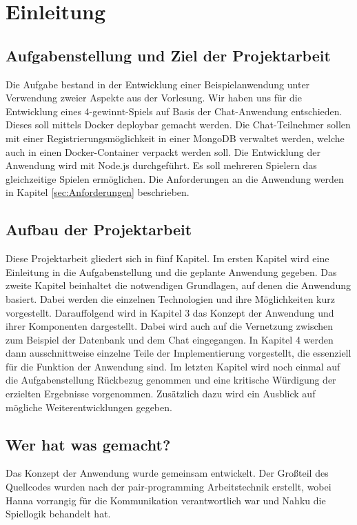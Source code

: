 
\chapter{Einleitung}\label{cha:Einleitung}

\section{Aufgabenstellung und Ziel der Projektarbeit}\label{sec:Aufgabenstellung}
Die Aufgabe bestand in der Entwicklung einer Beispielanwendung unter Verwendung zweier Aspekte aus der Vorlesung. Wir haben uns für die Entwicklung eines 4-gewinnt-Spiels auf Basis der Chat-Anwendung entschieden. Dieses soll mittels Docker deploybar gemacht werden. Die Chat-Teilnehmer sollen mit einer Registrierungsmöglichkeit in einer MongoDB verwaltet werden, welche auch in einen Docker-Container verpackt werden soll. Die Entwicklung der Anwendung wird mit Node.js durchgeführt. Es soll mehreren Spielern das gleichzeitige Spielen ermöglichen. Die Anforderungen an die Anwendung werden in Kapitel \ref{sec:Anforderungen} beschrieben.
\section{Aufbau der Projektarbeit}\label{sec:Aufbau}
Diese Projektarbeit gliedert sich in fünf Kapitel. Im ersten Kapitel wird eine Einleitung in die Aufgabenstellung und die geplante Anwendung gegeben. Das zweite Kapitel beinhaltet die notwendigen Grundlagen, auf denen die Anwendung basiert. Dabei werden die einzelnen Technologien und ihre Möglichkeiten kurz vorgestellt. Darauffolgend wird in Kapitel 3 das Konzept der Anwendung und ihrer Komponenten dargestellt. Dabei wird auch auf die Vernetzung zwischen zum Beispiel der Datenbank und dem Chat eingegangen. In Kapitel 4 werden dann ausschnittweise einzelne Teile der Implementierung vorgestellt, die essenziell für die Funktion der Anwendung sind. Im letzten Kapitel wird noch einmal auf die Aufgabenstellung Rückbezug genommen und eine kritische Würdigung der erzielten Ergebnisse vorgenommen. Zusätzlich dazu wird ein Ausblick auf mögliche Weiterentwicklungen gegeben.
\section{Wer hat was gemacht?}\label{sec:Aufteilung}
Das Konzept der Anwendung wurde gemeinsam entwickelt. Der Großteil des Quellcodes wurden nach der pair-programming Arbeitstechnik erstellt, wobei Hanna vorrangig für die Kommunikation verantwortlich war und Nahku die Spiellogik behandelt hat.